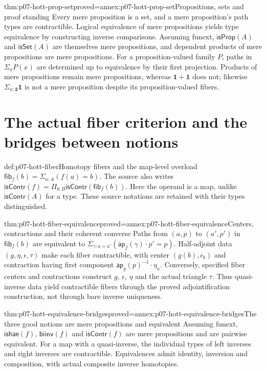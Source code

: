 \begin{hbtheorem}{thm:p07-hott-prop-set}{proved=annex:p07-hott-prop-set}{Propositions, sets and proof standing}
Every mere proposition is a set, and a mere proposition's path types are
contractible. Logical equivalence of mere propositions yields type
equivalence by constructing inverse comparisons.
Assuming funext, $\mathsf{isProp}(A)$ and $\mathsf{isSet}(A)$ are themselves
mere propositions, and dependent products of mere propositions are mere
propositions. For a proposition-valued family $P$, paths in
$\Sigma_xP(x)$ are determined up to equivalence by their first projection.
Products of mere propositions remain mere propositions, whereas
$\mathbf1+\mathbf1$ does not; likewise $\Sigma_{x:\mathbf2}\mathbf1$
is not a mere proposition despite its proposition-valued fibers.
\end{hbtheorem}

\section{The actual fiber criterion and the bridges between notions}
\label{sec:p07-hott-fibers}

\begin{hbdefinition}{def:p07-hott-fiber}{Homotopy fibers and the map-level overload}
$\mathsf{fib}_f(b)=\Sigma_{a:A}(f(a)=b)$.
The source also writes
$\mathsf{isContr}(f)=\Pi_{b:B}\mathsf{isContr}(\mathsf{fib}_f(b))$.
Here the operand is a map, unlike $\mathsf{isContr}(A)$ for a type.
These source notations are retained with their types distinguished.
\end{hbdefinition}

\begin{hbtheorem}{thm:p07-hott-fiber-equivalence}{proved=annex:p07-hott-fiber-equivalence}{Centers, contractions and their coherent converse}
Paths from $(a,p)$ to $(a',p')$ in $\mathsf{fib}_f(b)$ are equivalent to
$\Sigma_{\gamma:a=a'}(\mathsf{ap}_f(\gamma)\cdot p'=p)$.
Half-adjoint data $(g,\eta,\epsilon,\tau)$ make each fiber contractible,
with center $(g(b),\epsilon_b)$ and contraction having first component
$\mathsf{ap}_g(p)^{-1}\cdot\eta_a$.
Conversely, specified fiber centers and contractions construct $g$,
$\epsilon$, $\eta$ and the actual triangle $\tau$.
Thus quasi-inverse data yield contractible fibers through the proved
adjointification construction, not through bare inverse uniqueness.
\end{hbtheorem}

\begin{hbtheorem}{thm:p07-hott-equivalence-bridges}{proved=annex:p07-hott-equivalence-bridges}{The three good notions are mere propositions and equivalent}
Assuming funext, $\mathsf{ishae}(f)$, $\mathsf{biinv}(f)$ and
$\mathsf{isContr}(f)$ are mere propositions and are pairwise equivalent.
For a map with a quasi-inverse, the individual types of left inverses
and right inverses are contractible. Equivalences admit identity,
inversion and composition, with actual composite inverse homotopies.
\end{hbtheorem}

